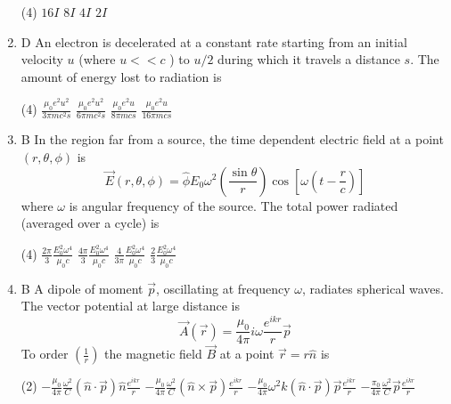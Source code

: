 \begin{enumerate}
{}
 \begin{tasks}(4)
	\task[\textbf{a.}] $16 I$
	\task[\textbf{b.}]$8 I$
	\task[\textbf{c.}]$4 I$
	\task[\textbf{d.}] $2 I$
\end{tasks}
\item D An electron is decelerated at a constant rate starting from an initial velocity $u$ (where $u<<c$ ) to $u / 2$ during which it travels a distance $s$. The amount of energy lost to radiation is
{}
 \begin{tasks}(4)
	\task[\textbf{a.}]$\frac{\mu_{0} e^{2} u^{2}}{3 \pi m c^{2} s}$
	\task[\textbf{b.}]$\frac{\mu_{0} e^{2} u^{2}}{6 \pi m c^{2} s}$
	\task[\textbf{c.}]$\frac{\mu_{0} e^{2} u}{8 \pi m c s}$
	\task[\textbf{d.}] $\frac{\mu_{0} e^{2} u}{16 \pi m c s}$
\end{tasks}
\item B In the region far from a source, the time dependent electric field at a point $(r, \theta, \phi)$ is
$$
\vec{E}(r, \theta, \phi)=\hat{\phi} E_{0} \omega^{2}\left(\frac{\sin \theta}{r}\right) \cos \left[\omega\left(t-\frac{r}{c}\right)\right]
$$
where $\omega$ is angular frequency of the source. The total power radiated (averaged over a cycle) is
{}
 \begin{tasks}(4)
	\task[\textbf{a.}]$\frac{2 \pi}{3} \frac{E_{0}^{2} \omega^{4}}{\mu_{0} c}$
	\task[\textbf{b.}]$\frac{4 \pi}{3} \frac{E_{0}^{2} \omega^{4}}{\mu_{0} c}$
	\task[\textbf{c.}] $\frac{4}{3 \pi} \frac{E_{0}^{2} \omega^{4}}{\mu_{0} c}$
	\task[\textbf{d.}] $\frac{2}{3} \frac{E_{0}^{2} \omega^{4}}{\mu_{0} c}$
\end{tasks}
\item B A dipole of moment $\vec{p}$, oscillating at frequency $\omega$, radiates spherical waves. The vector potential at large distance is
$$
\vec{A}(\vec{r})=\frac{\mu_{0}}{4 \pi} i \omega \frac{e^{i k r}}{r} \vec{p}
$$
To order $\left(\frac{1}{r}\right)$ the magnetic field $\vec{B}$ at a point $\vec{r}=r \hat{n}$ is
{}
 \begin{tasks}(2)
	\task[\textbf{a.}]$-\frac{\mu_{0}}{4 \pi} \frac{\omega^{2}}{C}(\hat{n} \cdot \vec{p}) \hat{n} \frac{e^{i k r}}{r}$
	\task[\textbf{b.}] $-\frac{\mu_{0}}{4 \pi} \frac{\omega^{2}}{C}(\hat{n} \times \vec{p}) \frac{e^{i k r}}{r}$
	\task[\textbf{c.}] $-\frac{\mu_{0}}{4 \pi} \omega^{2} k(\hat{n} \cdot \vec{p}) \vec{p} \frac{e^{i k r}}{r}$
	\task[\textbf{d.}] $-\frac{\pi_{0}}{4 \pi} \frac{\omega^{2}}{C} \vec{p} \frac{e^{i k r}}{r}$
\end{tasks}

\end{enumerate}
